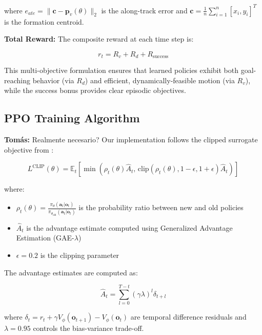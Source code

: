 \documentclass[preprint,3p]{elsarticle}
\newcommand{\tcom}[1]{{ \color{blue}\textbf{Tomás:} #1}}
\begin{document}
where $e_{ate} = \|\mathbf{c} - \mathbf{p}_v(\theta)\|_2$ is the along-track error and $\mathbf{c} = \frac{1}{n}\sum_{i=1}^n [x_i, y_i]^T$ is the formation centroid.

\vspace{1em}

\textbf{Total Reward:} The composite reward at each time step is:

\begin{equation}
    r_t = R_v + R_d + R_{\text{success}}
\end{equation}

This multi-objective formulation ensures that learned policies exhibit both goal-reaching behavior (via $R_d$) and efficient, dynamically-feasible motion (via $R_v$), while the success bonus provides clear episodic objectives.

\subsection{PPO Training Algorithm}

\tcom{Realmente necesario?}
Our implementation follows the clipped surrogate objective from \cite{schulman2017proximalpolicyoptimizationalgorithms}:

\begin{equation}
    L^{\text{CLIP}}(\theta) = \mathbb{E}_t \left[ \min\left( \rho_t(\theta) \hat{A}_t, \, \text{clip}(\rho_t(\theta), 1-\epsilon, 1+\epsilon) \hat{A}_t \right) \right]
\end{equation}

where:
\begin{itemize}
    \item $\rho_t(\theta) = \frac{\pi_\theta(\mathbf{a}_t|\mathbf{o}_t)}{\pi_{\theta_{\text{old}}}(\mathbf{a}_t|\mathbf{o}_t)}$ is the probability ratio between new and old policies
    \item $\hat{A}_t$ is the advantage estimate computed using Generalized Advantage Estimation (GAE-$\lambda$) \cite{schulman2015high}
    \item $\epsilon = 0.2$ is the clipping parameter
\end{itemize}

The advantage estimates are computed as:

\begin{equation}
    \hat{A}_t = \sum_{l=0}^{T-t} (\gamma \lambda)^l \delta_{t+l}
\end{equation}

where $\delta_t = r_t + \gamma V_\phi(\mathbf{o}_{t+1}) - V_\phi(\mathbf{o}_t)$ are temporal difference residuals and $\lambda = 0.95$ controls the bias-variance trade-off.
\end{document}
